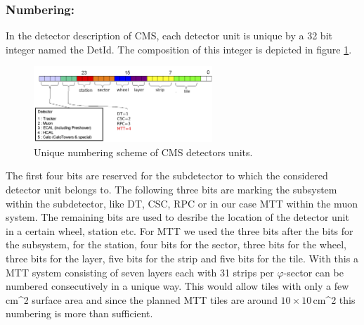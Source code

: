 			\subsubsection*{Numbering:}
			In the detector description of CMS, each detector unit is unique by a 32 bit integer named the DetId.
			The composition of this integer is depicted in figure \ref{fig:numbering}.
			\begin{figure}[htbp]
				\centering
				\includegraphics[width=0.6\textwidth]{Figures/erdogan/numbering.png}
				\caption{Unique numbering scheme of CMS detectors units.}
				\label{fig:numbering}
			\end{figure}
			The first four bits are reserved for the subdetector to which the considered detector unit belongs to.
			The following three bits are marking the subsystem within the subdetector, like DT, CSC, RPC or in our case MTT within the muon system.
			The remaining bits are used to desribe the location of the detector unit in a certain wheel, station etc.
			For MTT we used the three bits after the bits for the subsystem, for the station, four bits for the sector, three bits for the wheel, three bits for the layer, five bits for the strip and five bits
			for the tile.
			With this a MTT system consisting of seven layers each with 31 strips per $\varphi$-sector can be numbered consecutively in a unique way.
			This would allow tiles with only a few cm^2 surface area and since the planned MTT tiles are around $10\times10$\,cm^2 this numbering is more than sufficient.
